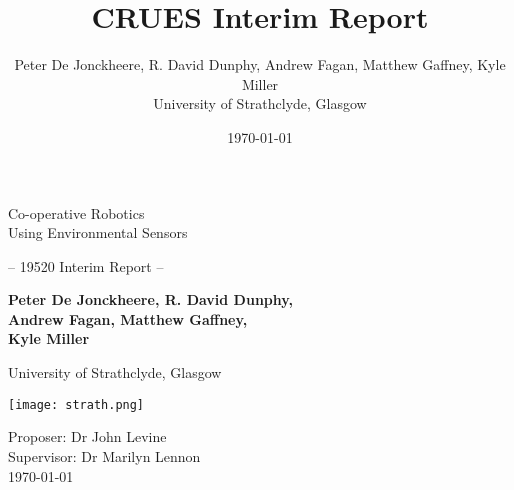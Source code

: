 
\title{CRUES Interim Report}
\author{Peter De Jonckheere, R. David Dunphy, Andrew Fagan, Matthew Gaffney,
Kyle Miller\\University of Strathclyde, Glasgow}
\date{\today}

\thispagestyle{empty}
\begin{center}

    \LARGE
    Co-operative Robotics\\Using Environmental Sensors

    \vspace{1.5cm}

    \large
    -- 19520 Interim Report --

    \vspace{1.5cm}

    \textbf{Peter De Jonckheere, R. David Dunphy,\\Andrew Fagan,
        Matthew Gaffney,\\Kyle Miller}

    \vspace{0.3cm}

    University of Strathclyde, Glasgow

    \vspace{2cm}
    \texttt{[image: strath.png]}

    \vfill{}

    \normalsize
    Proposer: Dr John Levine\\
    Supervisor: Dr Marilyn Lennon\\
    \today

\end{center}
\restoregeometry{}
